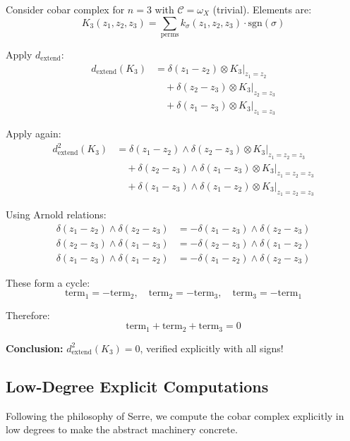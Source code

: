 \begin{example}\label{ex:three-point-signs-cobar}
Consider cobar complex for $n=3$ with $\mathcal{C} = \omega_X$ (trivial). Elements are:
$$K_3(z_1, z_2, z_3) = \sum_{\text{perms}} k_\sigma(z_1, z_2, z_3) \cdot 
\text{sgn}(\sigma)$$

Apply $d_{\text{extend}}$:
\begin{align*}
d_{\text{extend}}(K_3) &= \delta(z_1 - z_2) \otimes K_3|_{z_1=z_2} \\
&\quad + \delta(z_2 - z_3) \otimes K_3|_{z_2=z_3} \\
&\quad + \delta(z_1 - z_3) \otimes K_3|_{z_1=z_3}
\end{align*}

Apply again:
\begin{align*}
d_{\text{extend}}^2(K_3) &= \delta(z_1 - z_2) \wedge \delta(z_2 - z_3) \otimes 
K_3|_{z_1=z_2=z_3} \\
&\quad + \delta(z_2 - z_3) \wedge \delta(z_1 - z_3) \otimes K_3|_{z_1=z_2=z_3} \\
&\quad + \delta(z_1 - z_3) \wedge \delta(z_1 - z_2) \otimes K_3|_{z_1=z_2=z_3}
\end{align*}

Using Arnold relations:
\begin{align*}
\delta(z_1 - z_2) \wedge \delta(z_2 - z_3) &= -\delta(z_1 - z_3) \wedge \delta(z_2 - z_3) \\
\delta(z_2 - z_3) \wedge \delta(z_1 - z_3) &= -\delta(z_2 - z_3) \wedge \delta(z_1 - z_2) \\
\delta(z_1 - z_3) \wedge \delta(z_1 - z_2) &= -\delta(z_1 - z_2) \wedge \delta(z_2 - z_3)
\end{align*}

These form a cycle:
$$\text{term}_1 = -\text{term}_2, \quad \text{term}_2 = -\text{term}_3, \quad 
\text{term}_3 = -\text{term}_1$$

Therefore:
$$\text{term}_1 + \text{term}_2 + \text{term}_3 = 0$$

\textbf{Conclusion:} $d_{\text{extend}}^2(K_3) = 0$, verified explicitly with all signs!
\end{example}

\subsection{Low-Degree Explicit Computations}

Following the philosophy of Serre, we compute the cobar complex explicitly in low 
degrees to make the abstract machinery concrete.

